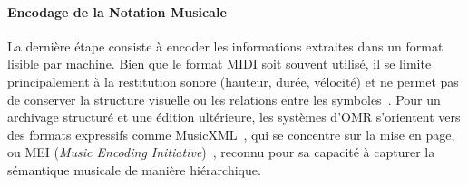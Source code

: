 \documentclass[a4paper,10pt]{article}
\begin{document}
\paragraph{Encodage de la Notation Musicale}

La dernière étape consiste à encoder les informations extraites dans un format lisible par machine. Bien que le format MIDI soit souvent utilisé, il se limite principalement à la restitution sonore (hauteur, durée, vélocité) et ne permet pas de conserver la structure visuelle ou les relations entre les symboles~\cite{shatri2020opticalmusicrecognitionstate}. Pour un archivage structuré et une édition ultérieure, les systèmes d'OMR s'orientent vers des formats expressifs comme MusicXML~\cite{good2001}, qui se concentre sur la mise en page, ou MEI (\textit{Music Encoding Initiative})~\cite{roland2002}, reconnu pour sa capacité à capturer la sémantique musicale de manière hiérarchique.

\newpage



\end{document}

